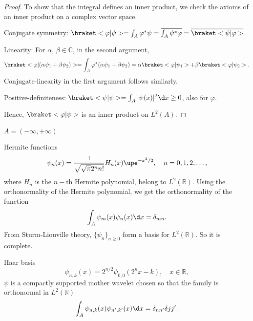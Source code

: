 \begin{solution}\leavevmode
  \begin{enumext}
    \item \begin{proof}
    To show that the integral defines an inner product, we check the axioms of an inner product on a complex vector space.
    \begin{enumext}
      \item Conjugate symmetry: $\braket<\varphi|\psi> = \int_A \varphi^*\psi
      = \overline{\int_A \psi^*\varphi} = \overline{\braket<\psi|\varphi>}$.
      \item Linearity: For $\alpha$, $\beta \in \mathbb C$,
      in the second argument,
      \[
        \braket<\varphi|(\alpha\psi_1 + \beta\psi_2)>
      = \int_A \varphi^*(\alpha\psi_1 + \beta\psi_2)
      = \alpha\braket<\varphi|\psi_1> + \beta\braket<\varphi|\psi_2>.
      \]
      Conjugate-linearity in the first argument follows similarly.
      \item Positive-definiteness: $\braket<\psi|\psi> = \int_A |\psi(x)|^2 \d x\geq 0$, also for $\varphi$.
    \end{enumext}
    Hence, $\braket<\varphi|\psi>$ is an inner product on $L^2(A)$.
    \end{proof}
    \item \begin{enumext}
      \item $A = (-\infty, +\infty)$
      \begin{enumext}[wrap-label = \underline{Case #1}, label = \arabic*,
                      list-indent = 0pt]
        \item Hermite functions
        \[
          \psi_n(x) = \frac1{\sqrt{\sqrt\pi2^nn!}} H_n(x) \upe^{-x^2/2}, \quad
          n = 0,1,2,\ldots,
        \]
        where $H_n$ is the $n-$th Hermite polynomial, belong to $L^2(\mathbb R)$.
        Using the orthonormality of the Hermite polynomial,
        we get the orthonormality of the function
        \[
          \int_A \psi_m(x) \psi_n(x) \d x = \delta_{mn}.
        \]
        From Sturm-Liouville theory,
        $\{\psi_n\}_{n\geq0}$ form a basis for $L^2(\mathbb R)$.
        So it is complete.
        \item Haar basis
        \[
          \psi_{n,k}(x) = 2^{n/2} \psi_{0,0}(2^nx - k), \quad x \in \mathbb R,
        \]
        $\psi$ is a compactly supported mother wavelet chosen so that the  family is orthonormal in $L^2(\mathbb R)$
        \[
          \int_A \psi_{n,k}(x) \psi_{n',k'}(x) \d x = \delta_{nn'}\delta{jj'}.
\]
\end{enumext}
\end{enumext}
\end{enumext}
\end{solution}
